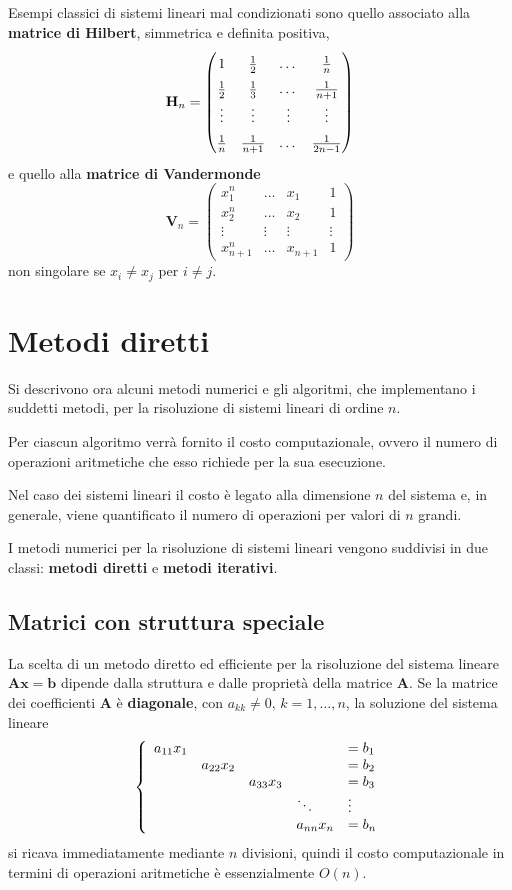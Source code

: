 Esempi classici di sistemi lineari mal condizionati sono quello associato alla \textbf{matrice di
Hilbert}, simmetrica e definita positiva,
\[\textbf{H}_n=\left(
    \renewcommand{\arraystretch}{1.5}
    \begin{matrix}
    1 & \frac{1}{2} & \dots & \frac{1}{n} \\
    \frac{1}{2} & \frac{1}{3} & \dots & \frac{1}{n+1} \\
    \vdots & \vdots & \vdots & \vdots \\
    \frac{1}{n} & \frac{1}{n+1} & \dots & \frac{1}{2n-1}
    \end{matrix}
    \renewcommand{\arraystretch}{1}
\right)\]
e quello alla \textbf{matrice di Vandermonde}
\[\textbf{V}_n=\left(
    \begin{matrix}
    x_1^n & \dots & x_1 & 1 \\
    x_2^n & \dots & x_2 & 1 \\
    \vdots & \vdots & \vdots & \vdots \\
    x_{n+1}^n & \dots & x_{n+1} & 1
    \end{matrix}
\right)\]
non singolare se $x_i\ne x_j$ per $i\ne j$.

\section{Metodi diretti}

Si descrivono ora alcuni metodi numerici e gli algoritmi, che implementano i suddetti metodi, per la
risoluzione di sistemi lineari di ordine $n$.

Per ciascun algoritmo verrà fornito il costo computazionale, ovvero il numero di operazioni
aritmetiche che esso richiede per la sua esecuzione.

Nel caso dei sistemi lineari il costo è legato alla dimensione $n$ del sistema e, in generale, viene
quantificato il numero di operazioni per valori di $n$ grandi.

I metodi numerici per la risoluzione di sistemi lineari vengono suddivisi in due classi:
\textbf{metodi diretti} e \textbf{metodi iterativi}.

\subsection{Matrici con struttura speciale}

La scelta di un metodo diretto ed efficiente per la risoluzione del sistema lineare $\mathbf{Ax}=
\mathbf{b}$ dipende dalla struttura e dalle proprietà della matrice $\mathbf{A}$. Se la matrice dei
coefficienti $\mathbf{A}$ è \textbf{diagonale}, con $a_{kk}\ne0,\,k=1,\dots,n$, la soluzione del sistema lineare
\[\left\{\begin{array}{c c c l l}
a_{11}x_1 & & & & = b_1 \\
& a_{22}x_2 & & & = b_2 \\
& & a_{33}x_3 & & = b_3 \\
& & & \ddots & \vdots \\
& & & a_{nn}x_n & = b_n
\end{array}\right.\]
si ricava immediatamente mediante $n$ divisioni, quindi il costo computazionale in termini di operazioni
aritmetiche è essenzialmente $O(n)$.\newpage

